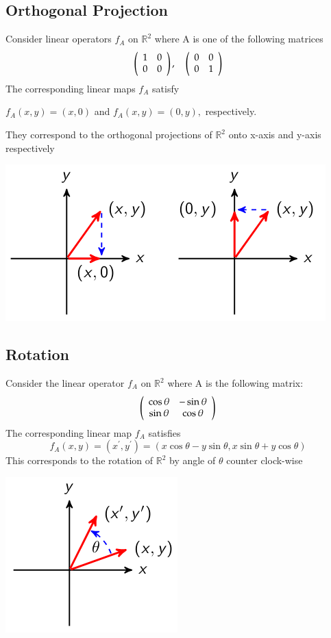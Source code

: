 \documentclass{article}[18pt]
\begin{document}
\subsection{Orthogonal Projection}
Consider linear operators $f_A$ on $\mathbb{R}^2$ where A is one of the following matrices
$$\left( \begin{array} { l l } { 1 } & { 0 } \\ { 0 } & { 0 } \end{array} \right) , \quad \left( \begin{array} { l l } { 0 } & { 0 } \\ { 0 } & { 1 } \end{array} \right)$$
The corresponding linear maps $f_A$ satisfy
\begin{center}
	$f _ { A } ( x , y ) = ( x , 0 )$ and $f _ { A } ( x , y ) = ( 0 , y ) ,$ respectively.
\end{center}
They correspond to the orthogonal projections of $\mathbb{R}^2$ onto x-axis and y-axis respectively
\begin{center}
	\includegraphics[scale=0.7]{projections}
\end{center}
 \subsection{Rotation}
 Consider the linear operator $f_A$ on $\mathbb{R}^2$ where A is the following matrix:
 $$\left( \begin{array} { c c } { \cos \theta } & { - \sin \theta } \\ { \sin \theta } & { \cos \theta } \end{array} \right)$$
 The corresponding linear map $f_A$ satisfies
 $$f _ { A } ( x , y ) = \left( x ^ { \prime } , y ^ { \prime } \right) = ( x \cos \theta - y \sin \theta , x \sin \theta + y \cos \theta )$$
This corresponds to the rotation of $\mathbb{R}^2$ by angle of $\theta$ counter clock-wise
\begin{center}
	\includegraphics[scale=0.7]{rotation}
\end{center}
\end{document}
